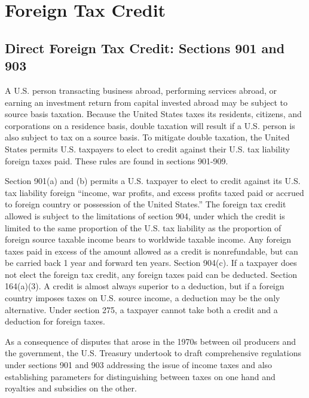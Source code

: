 \chapter{Foreign Tax Credit}

\section{Direct Foreign Tax Credit:  Sections 901 and 903}

A U.S. person transacting business abroad, performing services abroad, or earning an investment return from capital invested abroad may be subject to source basis taxation.  Because the United States taxes its residents, citizens, and corporations on a residence basis, double taxation will result if a U.S. person is also subject to tax on a source basis.  To mitigate double taxation, the United States permits U.S. taxpayers to elect to credit against their U.S. tax liability foreign taxes paid.  These rules are found in sections 901-909.

Section 901(a) and (b) permits a U.S. taxpayer to elect to credit against its U.S. tax liability foreign ``income, war profits, and excess profits taxed paid or accrued to foreign country or possession of the United States.''  The foreign tax credit allowed is subject to the limitations of section 904, under which the credit is limited to the same proportion of the U.S. tax liability as the proportion of foreign source taxable income bears to worldwide taxable income.  Any foreign taxes paid in excess of the amount allowed as a credit is nonrefundable, but can be carried back 1 year and forward ten years.  Section 904(c).  If a taxpayer does not elect the foreign tax credit, any foreign taxes paid can be deducted.  Section 164(a)(3).  A credit is almost always superior to a deduction, but if a foreign country imposes taxes on U.S. source income, a deduction may be the only alternative.  Under section 275, a taxpayer cannot take both a credit and a deduction for foreign taxes.

As a consequence of disputes that arose in the 1970s between oil producers and the government, the U.S. Treasury undertook to draft comprehensive regulations under sections 901 and 903 addressing the issue of income taxes and also establishing parameters for distinguishing between taxes on one hand and royalties and subsidies on the other.

